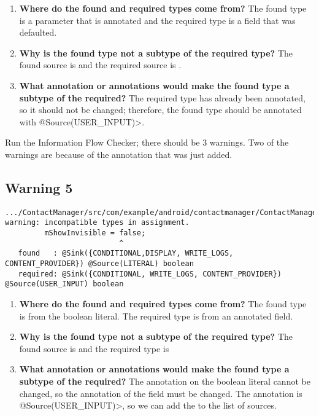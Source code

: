  \begin{enumerate}

\item\textbf{Where do the found and required types come from?}
   The found type is a parameter that is annotated and the required type is a field that was 
   defaulted.
\item  \textbf{ Why is the found type not a subtype of the required type?}
  The found source is  and the required source is . 
\item  \textbf{What annotation or annotations would make the found type a subtype of the required?}
  The required type has already been annotated, so it should not be changed; therefore, the
  found type should be annotated with \<@Source(USER\_INPUT)>.\newline
  
  
   \end{enumerate}

Run the Information Flow Checker; there should be 3 warnings.  Two of the warnings are because of the
annotation that was just added.

  \subsection{Warning 5}
   \begin{Verbatim}
.../ContactManager/src/com/example/android/contactmanager/ContactManager.java:63: 
warning: incompatible types in assignment.
         mShowInvisible = false;
                          ^
   found   : @Sink({CONDITIONAL,DISPLAY, WRITE_LOGS, CONTENT_PROVIDER}) @Source(LITERAL) boolean
   required: @Sink({CONDITIONAL, WRITE_LOGS, CONTENT_PROVIDER}) @Source(USER_INPUT) boolean
    \end{Verbatim} 

 \begin{enumerate}

\item\textbf{Where do the found and required types come from?}
   The found type is from the boolean literal.  The required type is from an annotated field.
  \item\textbf{ Why is the found type not a subtype of the required type?}
  The found source is  and the required type is 
  \item\textbf{What annotation or annotations would make the found type a subtype of the required?}
  The annotation on the boolean literal cannot be changed, so the annotation of the field must be changed.  The annotation is \<@Source(USER\_INPUT)>, so we can add the 
   to the list of sources.\newline
  
      \end{enumerate}

